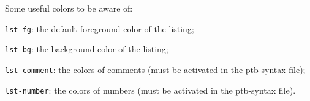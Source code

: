 Some useful colors to be aware of:
\blist
    \item {\tt lst-fg}: the default foreground color of the listing;
    \item {\tt lst-bg}: the background color of the listing;
    \item {\tt lst-comment}: the colors of comments (must be activated in the ptb-syntax file);
    \item {\tt lst-number}: the colors of numbers (must be activated in the ptb-syntax file).
\elist

